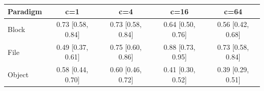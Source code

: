 \begin{tabular}{lcccc}
\toprule
Paradigm & c=1 & c=4 & c=16 & c=64 \\
\midrule
Block & 0.73 [0.58, 0.84] & 0.73 [0.58, 0.84] & 0.64 [0.50, 0.76] & 0.56 [0.42, 0.68] \\
File & 0.49 [0.37, 0.61] & 0.75 [0.60, 0.86] & 0.88 [0.73, 0.95] & 0.73 [0.58, 0.84] \\
Object & 0.58 [0.44, 0.70] & 0.60 [0.46, 0.72] & 0.41 [0.30, 0.52] & 0.39 [0.29, 0.51] \\
\bottomrule
\end{tabular}
